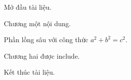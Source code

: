 \documentclass[12pt]{article}
\begin{document}
Mở đầu tài liệu.

Chương một nội dung.

Phần lồng sâu với công thức $a^2+b^2=c^2$.





\clearpage
Chương hai được include.

\clearpage

Kết thúc tài liệu.
\end{document}

